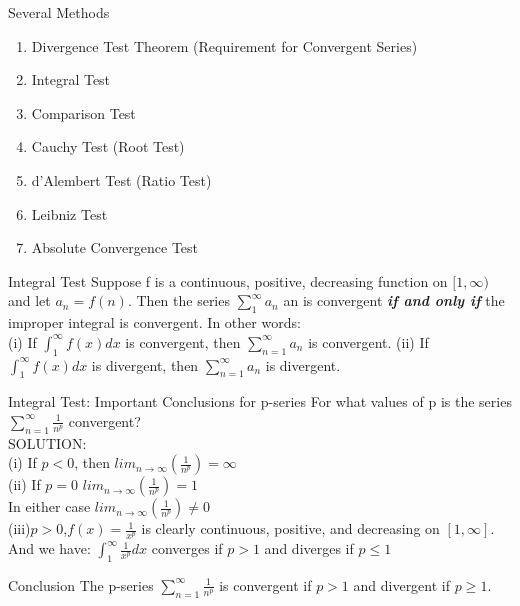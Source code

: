 \begin{frame}{Several Methods}
    \begin{enumerate}
        \item Divergence Test Theorem (Requirement for Convergent Series)
        \item Integral Test
        \item Comparison Test
        \item Cauchy Test (Root Test)
        \item d’Alembert Test (Ratio Test)
        \item Leibniz Test
        \item Absolute Convergence Test
    \end{enumerate}
\end{frame}



\begin{frame}{Integral Test}
    Suppose f is a continuous, positive, decreasing function on $[1,\infty)$ and let $a_n = f (n)$. Then the series $\sum_1^{\infty} a_n$ an is convergent \textbf{\textit{if and only if}} the improper integral is convergent. In other words:\\
    (i) If $\int_1^{\infty}f(x) dx$ is convergent, then $\sum_{n=1}^{\infty}a_n$ is convergent.
    (ii) If $\int_1^{\infty}f(x) dx$ is divergent, then $\sum_{n=1}^{\infty}a_n$ is divergent.

\end{frame}



\begin{frame}{Integral Test: Important Conclusions for p-series}
    For what values of p is the series $\sum\limits_{n=1}^{\infty} \frac{1}{n^p}$ convergent?\\
    SOLUTION:\\
    (i) If $p<0$, then $lim_{n\rightarrow \infty}(\frac{1}{n^p})=\infty$\\
    (ii) If $p=0$ $lim_{n\rightarrow \infty}(\frac{1}{n^p})=1$\\
    In either case $lim_{n\rightarrow \infty}(\frac{1}{n^p}) \neq 0$\\
    (iii)$p>0$,$f(x)=\frac{1}{x^p}$ is clearly continuous, positive, and decreasing on $[1,\infty]$. And we have:
    $\int_1^{\infty} \frac{1}{x^p} dx $ converges if $p>1$ and diverges if $p \leqslant 1$
    \begin{block}{Conclusion}
        The p-series $\sum_{n=1}^{\infty}\frac{1}{n^p}$
        is convergent if $p>1$ and divergent if $p \geqslant 1$.
    \end{block}
\end{frame}



